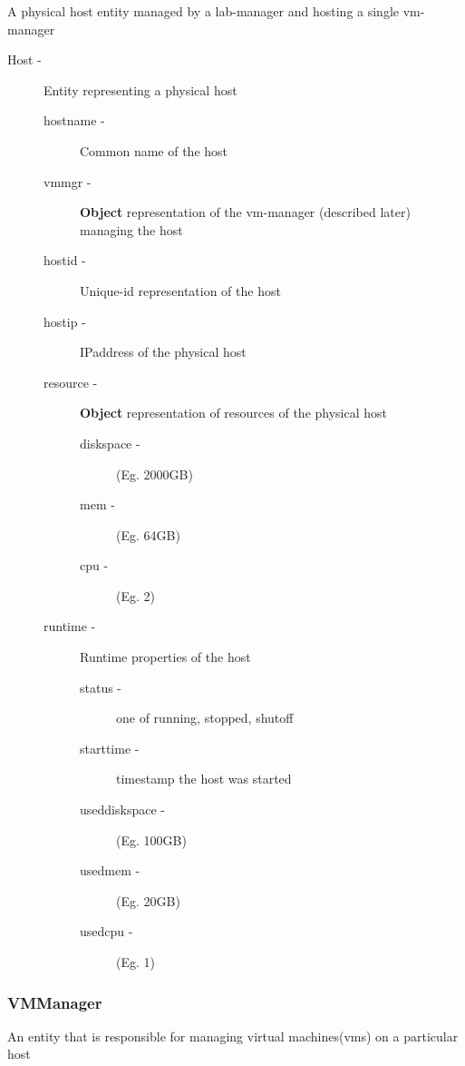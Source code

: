 \documentclass[11pt]{article}
\begin{document}
     A physical host entity managed by a lab-manager and hosting a single vm-manager
\begin{description}
\item [Host -] Entity representing a physical host

\begin{description}
\item [hostname -] Common name of the host
\item [vmmgr -] \textbf{Object} representation of the vm-manager
                         (described later) managing the host
\item [hostid -] Unique-id representation of the host
\item [hostip -] IPaddress of the physical host
\item [resource -]  \textbf{Object} representation of resources of the physical host

\begin{description}
\item [diskspace -] (Eg. 2000GB)
\item [mem -] (Eg. 64GB)
\item [cpu -] (Eg. 2)
\end{description}

\item [runtime -] Runtime properties of the host

\begin{description}
\item [status -] one of running, stopped, shutoff
\item [starttime -] timestamp the host was started
\item [useddiskspace -] (Eg. 100GB)
\item [usedmem -] (Eg. 20GB)
\item [usedcpu -] (Eg. 1)
\end{description}

\end{description}

\end{description}
\subsubsection{VMManager}
\label{sec-3.3.5}


     An entity that is responsible for managing virtual machines(vms)
     on a particular host
\end{document}
